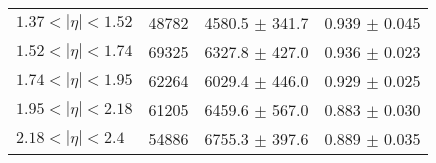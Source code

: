 \begin{tabular}{lccc}
$1.37 < |\eta| <1.52$          & 48782      & 4580.5     $\pm$ 341.7 & 0.939      $\pm$ 0.045 \\
$1.52 < |\eta| <1.74$          & 69325      & 6327.8     $\pm$ 427.0 & 0.936      $\pm$ 0.023 \\
$1.74 < |\eta| <1.95$          & 62264      & 6029.4     $\pm$ 446.0 & 0.929      $\pm$ 0.025 \\
$1.95 < |\eta| <2.18$          & 61205      & 6459.6     $\pm$ 567.0 & 0.883      $\pm$ 0.030 \\
$2.18 < |\eta| <2.4$           & 54886      & 6755.3     $\pm$ 397.6 & 0.889      $\pm$ 0.035 \\
\hline
\end{tabular}
